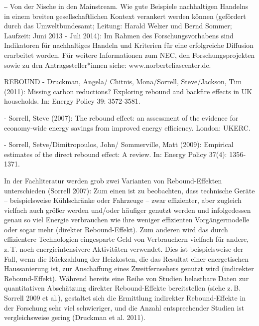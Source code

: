 ⎯	Von der Nische in den Mainstream. Wie gute Beispiele nachhaltigen Handelns in einem breiten gesellschaftlichen Kontext verankert werden können (gefördert durch das Umweltbundesamt; Leitung: Harald Welzer und Bernd Sommer; Laufzeit: Juni 2013 - Juli 2014): Im Rahmen des Forschungsvorhabens sind Indikatoren für nachhaltiges Handeln und Kriterien für eine erfolgreiche Diffusion erarbeitet worden. 
Für weitere Informationen zum NEC, den Forschungsprojekten sowie zu den Antragssteller*innen siehe: www.norberteliascenter.de.

REBOUND
-        Druckman, Angela/ Chitnis, Mona/Sorrell, Steve/Jackson, Tim (2011): Missing  carbon reductions? Exploring rebound and backfire effects in UK households. In: Energy Policy 39: 3572-3581.
 

-        Sorrell, Steve (2007): The rebound effect: an assessment of the evidence for economy‐wide energy savings from improved energy efficiency. London: UKERC.

-        Sorrell, Setve/Dimitropoulos, John/ Sommerville, Matt (2009): Empirical estimates of the direct rebound effect: A review. In: Energy Policy 37(4): 1356‐1371.

In der Fachliteratur werden grob zwei Varianten von Rebound-Effekten unterschieden (Sorrell 2007): Zum einen ist zu beobachten, dass technische Geräte – beispielsweise Kühlschränke oder Fahrzeuge – zwar effizienter, aber zugleich vielfach auch größer werden und/oder häufiger genutzt werden und infolgedessen genau so viel Energie verbrauchen wie ihre weniger effizienten Vorgängermodelle oder sogar mehr (direkter Rebound-Effekt). Zum anderen wird das durch effizientere Technologien eingesparte Geld von Verbrauchern vielfach für andere, z. T. noch energieintensivere Aktivitäten verwendet. Dies ist beispielsweise der Fall, wenn die Rückzahlung der Heizkosten, die das Resultat einer energetischen Haussanierung ist, zur Anschaffung eines Zweitfernsehers genutzt wird (indirekter Rebound-Effekt). Während bereits eine Reihe von Studien belastbare Daten zur quantitativen Abschätzung direkter Rebound-Effekte bereitstellen (siehe z. B. Sorrell 2009 et al.), gestaltet sich die Ermittlung indirekter Rebound-Effekte in der Forschung sehr viel schwieriger, und die Anzahl entsprechender Studien ist vergleichsweise gering (Druckman et al. 2011). 